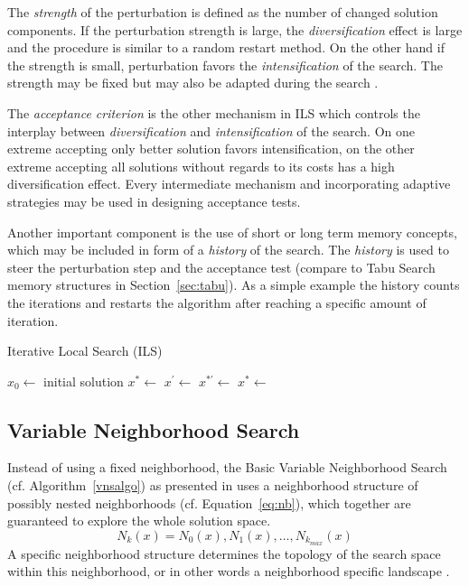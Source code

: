 The \emph{strength} of the perturbation is defined as the number of changed solution components. 
If the perturbation strength is large, the \emph{diversification} effect is large and the procedure is similar to a random restart method. On the other hand if the strength is small, perturbation favors the \emph{intensification} of the search. The strength may be fixed but may also be adapted during the search \cite{lourencco2001iterated}.

The \emph{acceptance criterion} is the other mechanism in ILS which controls the interplay between \emph{diversification} and \emph{intensification} of the search. 
On one extreme accepting only better solution favors intensification, on the other extreme accepting all solutions without regards to its costs has a high diversification effect. Every intermediate mechanism and incorporating adaptive strategies may be used in designing acceptance tests.  

Another important component is the use of short or long term memory concepts, which may be included in form of a \emph{history} of the search. The \emph{history} is used to steer the perturbation step and the acceptance test (compare to Tabu Search memory structures in Section~\ref{sec:tabu}). As a simple example the history counts the iterations and restarts the algorithm after reaching a specific amount of iteration.
 
\begin{algorithm}
\caption{Iterative Local Search (ILS)}
\label{ilsalgo}
\begin{algorithmic}[1]
\State $x_0\gets$ initial solution
\State $x^*\gets$ 
\Repeat
\State $x^\prime \gets$ 
\State $x^{*\prime} \gets$ 
\State $x^* \gets$ 
\end{algorithmic}
\end{algorithm}

\subsection{Variable Neighborhood Search}\label{sec:vns}
Instead of using a fixed neighborhood, the Basic Variable Neighborhood Search (cf. Algorithm~\ref{vnsalgo}) as presented in \cite{VNS} uses a neighborhood structure of possibly nested neighborhoods (cf. Equation~\ref{eq:nb}), which together are guaranteed to explore the whole solution space. 
\begin{equation}
N_k(x)=N_0(x),N_1(x),\dots,N_{k_{max}}(x)
\label{eq:nb}
\end{equation}
A specific neighborhood structure determines the topology of the search space within this neighborhood, or in other words a neighborhood specific landscape \cite{blum2003metaheuristics}.

